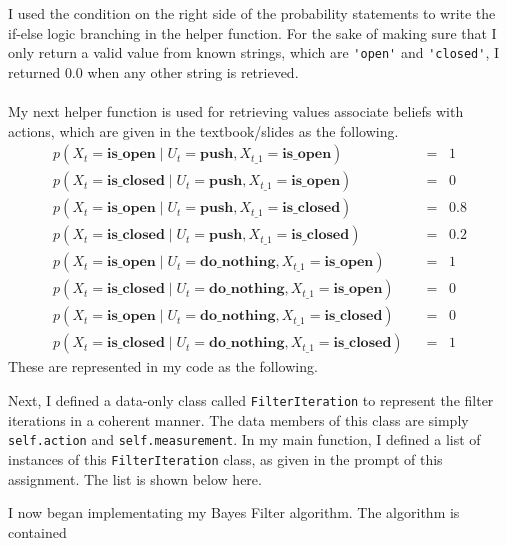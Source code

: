 \documentclass[12pt]{article}
\begin{document}
I used the condition on the right side of the probability statements to write the
if-else logic branching in the helper function. For the sake of making sure that
I only return a valid value from known strings, which are \lstinline{'open'} and
\lstinline{'closed'}, I returned $0.0$ when any other string is retrieved.\\
\vspace{0in}\\
My next helper function is used for retrieving values associate beliefs with
actions, which are given in the textbook/slides as the following.
\begin{align*}
    p(X_t = \mathbf{is\_open} \;|\; U_t = \mathbf{push},  X_{t\_1} = \mathbf{is\_open})\;\;&=\;\;1\\
    p(X_t = \mathbf{is\_closed} \;|\; U_t = \mathbf{push},  X_{t\_1} = \mathbf{is\_open})\;\;&=\;\;0\\
    p(X_t = \mathbf{is\_open} \;|\; U_t = \mathbf{push},  X_{t\_1} = \mathbf{is\_closed})\;\;&=\;\;0.8\\
    p(X_t = \mathbf{is\_closed} \;|\; U_t = \mathbf{push},  X_{t\_1} = \mathbf{is\_closed})\;\;&=\;\;0.2\\
    p(X_t = \mathbf{is\_open} \;|\; U_t = \mathbf{do\_nothing},  X_{t\_1} = \mathbf{is\_open})\;\;&=\;\;1\\
    p(X_t = \mathbf{is\_closed} \;|\; U_t = \mathbf{do\_nothing},  X_{t\_1} = \mathbf{is\_open})\;\;&=\;\;0\\
    p(X_t = \mathbf{is\_open} \;|\; U_t = \mathbf{do\_nothing},  X_{t\_1} = \mathbf{is\_closed})\;\;&=\;\;0\\
    p(X_t = \mathbf{is\_closed} \;|\; U_t = \mathbf{do\_nothing},  X_{t\_1} = \mathbf{is\_closed})\;\;&=\;\;1
\end{align*}
These are represented in my code as the following.

\vspace{0.15in}
Next, I defined a data-only class called \lstinline{FilterIteration} to represent
the filter iterations in a coherent manner.
The data members of this class are
simply \lstinline{self.action} and \lstinline{self.measurement}. In my main function,
I defined a list of instances of this \lstinline{FilterIteration} class, as given in
the prompt of this assignment. The list is shown below here.

\vspace{0.15in}
I now began implementating my Bayes Filter algorithm. The algorithm is contained
\end{document}
